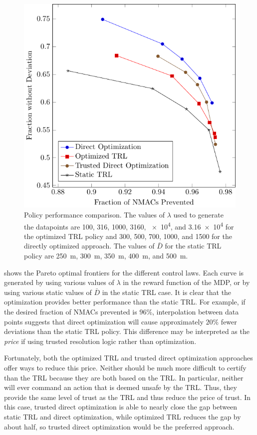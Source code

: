 \begin{figure}[tb]
    \centering
    \includegraphics[width=\columnwidth]{media/pareto.pdf}
    \caption[Policy performance comparison]{Policy performance comparison. The values of $\lambda$ used to generate the datapoints are \num{100}, \num{316}, \num{1000}, \num{3160}, \num{e4}, and \num{3.16e4} for the optimized TRL policy and \num{300}, \num{500}, \num{700}, \num{1000}, and \num{1500} for the directly optimized approach. The values of $\bar{D}$ for the static TRL policy are \SI{250}{m}, \SI{300}{m}, \SI{350}{m}, \SI{400}{m}, and \SI{500}{m}.}
       \label{fig:pareto}
\end{figure}

 shows the Pareto optimal frontiers for the different control laws. Each curve is generated by using various values of $\lambda$ in the reward function of the MDP, or by using various static values of $\bar{D}$ in the static TRL case. It is clear that the optimization provides better performance than the static TRL. For example, if the desired fraction of NMACs prevented is $96\%$, interpolation between data points suggests that direct optimization will cause approximately $20\%$ fewer deviations than the static TRL policy. This difference may be interpreted as the \emph{price} if using trusted resolution logic rather than optimization.

Fortunately, both the optimized TRL and trusted direct optimization approaches offer ways to reduce this price.
Neither should be much more difficult to certify than the TRL because they are both based on the TRL.
In particular, neither will ever command an action that is deemed unsafe by the TRL. 
Thus, they provide the same level of trust as the TRL and thus reduce the price of trust.
In this case, trusted direct optimization is able to nearly close the gap between static TRL and direct optimization, while optimized TRL reduces the gap by about half, so trusted direct optimization would be the preferred approach.

